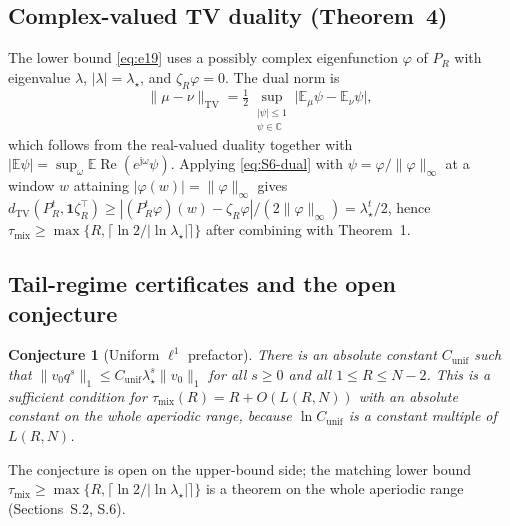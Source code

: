\documentclass[twoside,11pt]{article}
\newtheorem{sconj}[slemma]{Conjecture}
\begin{document}
\subsection{Complex-valued TV duality (Theorem~4)}
\label{sec:S6}

The lower bound \eqref{eq:e19} uses a possibly complex
eigenfunction $\varphi$ of $P_R$ with eigenvalue $\lambda$,
$|\lambda|=\lambda_\star$, and $\zeta_R\varphi=0$. The dual norm is
\begin{equation}\label{eq:S6-dual}
\|\mu-\nu\|_{\mathrm{TV}}
=\tfrac12\sup_{\substack{|\psi|\le1\\ \psi\in\mathbb C}}
\big|\mathbb E_{\mu}\psi-\mathbb E_{\nu}\psi\big|,
\end{equation}
which follows from the real-valued duality together with
$|\mathbb E\psi|=\sup_{\omega}\mathbb E\operatorname{Re}(e^{\mathrm{j}\omega}\psi)$.
Applying \eqref{eq:S6-dual} with $\psi=\varphi/\|\varphi\|_\infty$ at a window
$w$ attaining $|\varphi(w)|=\|\varphi\|_\infty$ gives
$d_{\mathrm{TV}}(P_R^{t},\mathbf 1\zeta_R^{\top})
\ge|(P_R^{t}\varphi)(w)-\zeta_R\varphi|/(2\|\varphi\|_\infty)
=\lambda_\star^{t}/2$, hence $\tau_{\mathrm{mix}}\ge\max\{R,\lceil\ln2/|\ln\lambda_\star|\rceil\}$ after
combining with Theorem~1.

\subsection{Tail-regime certificates and the open conjecture}
\label{sec:S7}

\begin{sconj}[Uniform $\ell^1$ prefactor]\label{conj:G}
There is an absolute constant $C_{\mathrm{unif}}$ such that
$\|v_0q^{s}\|_{1}\le C_{\mathrm{unif}}\lambda_\star^{s}\|v_0\|_{1}$ for all $s\ge0$ and all
$1\le R\le N-2$. This is a \emph{sufficient} condition for
$\tau_{\mathrm{mix}}(R)=R+O(L(R,N))$ with an absolute constant on the whole aperiodic
range, because $\ln C_{\mathrm{unif}}$ is a constant multiple of $L(R,N)$.
\end{sconj}

The conjecture is open on the upper-bound side; the matching
lower bound $\tau_{\mathrm{mix}}\ge\max\{R,\lceil\ln2/|\ln\lambda_\star|\rceil\}$ is a theorem
on the whole aperiodic range (Sections~S.2, S.6).
\end{document}
